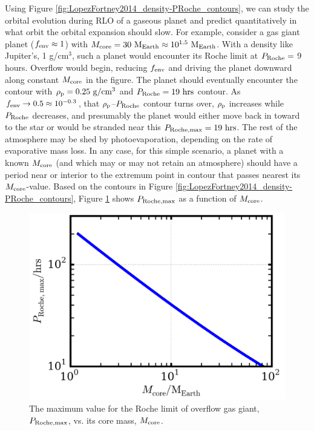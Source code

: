 \documentclass{svjour3}                     %
\begin{document}
Using Figure \ref{fig:LopezFortney2014_density-PRoche_contours}, we can study the orbital evolution during RLO of a gaseous planet and predict quantitatively in what orbit the orbital expansion should slow. For example, consider a gas giant planet ($f_{\rm env} \approx 1$) with $M_{\rm core} = 30\ {\rm M_{Earth}} \approx 10^{1.5}\ {\rm M_{Earth}}$. With a density like Jupiter's, 1 g/cm$^3$, such a planet would encounter its Roche limit at $P_{\rm Roche} =$ 9 hours. Overflow would begin, reducing $f_{\rm env}$ and driving the planet downward along constant $M_{\rm core}$ in the figure. The planet should eventually encounter the contour with $\rho_{\rm p} = 0.25\ {\rm g/cm^3}$ and $P_{\rm Roche} = 19\ {\rm hrs}$ contour. As $f_{\rm env} \rightarrow 0.5 \approx 10^{-0.3}$, that $\rho_{\rm p}$--$P_{\rm Roche}$ contour turns over, $\rho_{\rm p}$ increases while $P_{\rm Roche}$ decreases, and presumably the planet would either move back in toward to the star or would be stranded near this $P_{\rm Roche, max} = 19\ {\rm hrs}$. The rest of the atmosphere may be shed by photoevaporation, depending on the rate of evaporative mass loss. In any case, for this simple scenario, a planet with a known $M_{\rm core}$ (and which may or may not retain an atmosphere) should have a period near or interior to the extremum point in contour that passes nearest its $M_{\rm core}$-value. Based on the contours in Figure \ref{fig:LopezFortney2014_density-PRoche_contours}, Figure \ref{fig:PRoche-max_vs_Mcore} shows $P_{\rm Roche, max}$ as a function of $M_{\rm core}$. 

\begin{figure}
\includegraphics[width=\textwidth]{PRoche-max_vs_Mcore}
\caption{The maximum value for the Roche limit of overflow gas giant, $P_{\rm Roche, max}$, vs. its core mass, $M_{\rm core}$.}
\label{fig:PRoche-max_vs_Mcore}
\end{figure}
\end{document}
